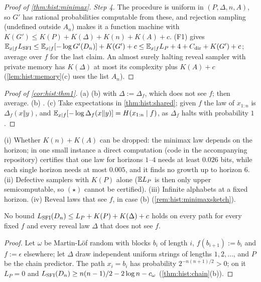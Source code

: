 \begin{proof}[Proof of \cref{thm:hist:minimax}]
\emph{Step 4.} The procedure is uniform in $(P,\Delta,n,A)$, so $G'$ has rational probabilities computable from these, and rejection sampling (undefined outside $A_n$) makes it a function machine with $K(G')\le K(P)+K(\Delta)+K(n)+K(A)+c$. (F1) gives $\mathbb{E}_{x\mid f}L_{\mathrm{SFI}}\le\mathbb{E}_{x\mid f}[-\log G'(D_n)]+K(G')+c\le\mathbb{E}_{x\mid f}L_P+4+C_{\rm dir}+K(G')+c$; average over $f$ for the last claim. An almost surely halting reveal sampler with private memory has $K(\Delta)$ at most its complexity plus $K(A)+c$ (\cref{lem:hist:memory}(c) uses the list $A_n$).
\end{proof}

\begin{proof}[Proof of \cref{cor:hist:thm1}]
(a) (b) with $\Delta:=\Delta_f$, which does not see $f$; then average. (b) . (c) Take expectations in \cref{thm:hist:shared}; given $f$ the law of $x_{1:n}$ is $\Delta_f(x\Vert y)$, and $\mathbb{E}_{x\mid f}[-\log\Delta_f(x\Vert y)]=H(x_{1:n}\mid f)$, as $\Delta_f$ halts with probability $1$.
\end{proof}

\begin{remark}\label{rem:hist:thm1open}
(i) Whether $K(n)+K(A)$ can be dropped: the minimax law depends on the horizon; in one small instance a direct computation (code in the accompanying repository) certifies that one law for horizons $1$--$4$ needs at least $0.026$ bits, while each single horizon needs at most $0.005$, and it finds no growth up to horizon $6$. (ii) Defective samplers with $K(P)$ alone ($\mathbb{E} L_P$ is then only upper semicomputable, so $(\star)$ cannot be certified). (iii) Infinite alphabets at a fixed horizon. (iv) Reveal laws that see $f$, in case (b) (\cref{rem:hist:minimaxsketch}).
\end{remark}

\begin{proposition}\label{prop:hist:nopathwise}
No bound $L_{\mathrm{SFI}}(D_n)\le L_P+K(P)+K(\Delta)+c$ holds on every path for every fixed $f$ and every reveal law $\Delta$ that does not see $f$.
\end{proposition}

\begin{proof}
Let $\omega$ be Martin-L\"of random with blocks $b_i$ of length $i$, $f(b_{i+1}):=b_i$ and $f:=\epsilon$ elsewhere; let $\Delta$ draw independent uniform strings of lengths $1,2,\dots$, and $P$ be the chain predictor. The path $x_i=b_i$ has probability $2^{-n(n+1)/2}>0$; on it $L_P=0$ and $L_{\mathrm{SFI}}(D_n)\ge n(n-1)/2-2\log n-c_\omega$ (\cref{thm:hist:chain}(b)).
\end{proof}

